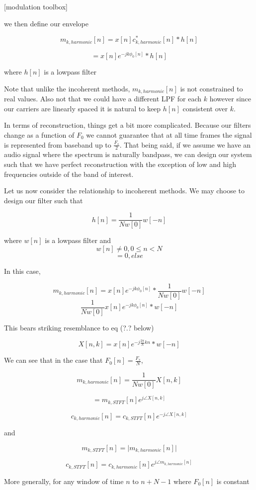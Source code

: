 \documentclass [11pt, proquest] {uwthesis}[2015/03/03]
\begin{document}
[modulation toolbox]

we then define our envelope

$$m_{k,harmonic}[n] = x[n] c_{k,harmonic}^*[n] * h[n]$$

$$= x[n] e^{-jk\phi_0 [n]} * h[n]$$

where $h[n]$ is a lowpass filter

Note that unlike the incoherent methods, $m_{k,harmonic}[n]$ is not constrained to real values.  Also not that we could have a different LPF for each $k$ however since our carriers are linearly spaced it is natural to keep $h[n]$ consistent over $k$.

In terms of reconstruction, things get a bit more complicated.  Because our filters change as a function of $F_0$ we cannot guarantee that at all time frames the signal is represented from baseband up to $\frac{F_s}{2}$.  That being said, if we assume we have an audio signal where the spectrum is naturally bandpass, we can design our system such that we have perfect reconstruction with the exception of low and high frequencies outside of the band of interest.

Let us now consider the relationship to incoherent methods.  We may choose to design our filter such that

$$h[n] = \frac{1}{Nw[0]} w[-n]$$

where $w[n]$ is a lowpass filter and 
$$w[n] \neq 0, 0 \leq n < N$$
$$ = 0, else$$

In this case,

$$m_{k,harmonic}[n] = x[n] e^{-jk\phi_0 [n]} *  \frac{1}{Nw[0]} w[-n]$$
$$\frac{1}{Nw[0]} x[n] e^{-jk\phi_0 [n]} *  w[-n]$$

This bears striking resemblance to eq (?.? below)

$$X[n,k] = x[n] e^{-j\frac{2\pi}{N}kn} * w[-n]$$

We can see that in the case that $F_0[n] = \frac{F_s}{N}$,

$$m_{k,harmonic}[n] = \frac{1}{Nw[0]} X[n,k]$$

$$= m_{k,STFT}[n] e^{j \angle X[n,k]}$$

$$c_{k,harmonic}[n] = c_{k,STFT}[n] e^{-j \angle X[n,k]}$$

and

$$m_{k,STFT}[n] = \vert m_{k,harmonic}[n] \vert $$

$$c_{k,STFT}[n] = c_{k,harmonic}[n] e^{j \angle m_{k,harmonic}[n]}$$

More generally, for any window of time $n$ to $n + N - 1$ where $F_0[n]$ is constant
\end{document}

